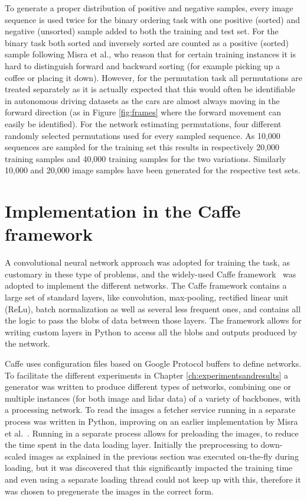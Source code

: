 To generate a proper distribution of positive and negative samples, every image sequence is used twice for the binary ordering task with one positive (sorted) and negative (unsorted) sample added to both the training and test set. For the binary task both sorted and inversely sorted are counted as a positive (sorted) sample following Misra et al.\cite{misra2016}, who reason that for certain training instances it is hard to distinguish forward and backward sorting (for example picking up a coffee or placing it down). However, for the permutation task all permutations are treated separately as it is actually expected that this would often be identifiable in autonomous driving datasets as the cars are almost always moving in the forward direction (as in Figure \ref{fig:frames} where the forward movement can easily be identified). For the network estimating permutations, four different randomly selected permutations used for every sampled sequence. As 10,000 sequences are sampled for the training set this results in respectively 20,000 training samples and 40,000 training samples for the two variations. Similarly 10,000 and 20,000 image samples have been generated for the respective test sets. 

\section{Implementation in the Caffe framework}
A convolutional neural network approach was adopted for training the task, as customary in these type of problems, and the widely-used Caffe framework~\cite{jia2014} was adopted to implement the different networks. The Caffe framework contains a large set of standard layers, like convolution, max-pooling, rectified linear unit (ReLu), batch normalization as well as several less frequent ones, and contains all the logic to pass the blobs of data between those layers. The framework allows for writing custom layers in Python to access all the blobs and outputs produced by the network.

Caffe uses configuration files based on Google Protocol buffers to define networks. To facilitate the different experiments in Chapter \ref{ch:experimentsandresults} a generator was written to produce different types of networks, combining one or multiple instances (for both image and lidar data) of a variety of backbones, with a processing network. To read the images a fetcher service running in a separate process was written in Python, improving on an earlier implementation by Misra et al.~\cite{misra2016}. Running in a separate process allows for preloading the images, to reduce the time spent in the data loading layer. Initially the preprocessing to down-scaled images as explained in the previous section was executed on-the-fly during loading, but it was discovered that this significantly impacted the training time and even using a separate loading thread could not keep up with this, therefore it was chosen to pregenerate the images in the correct form.

